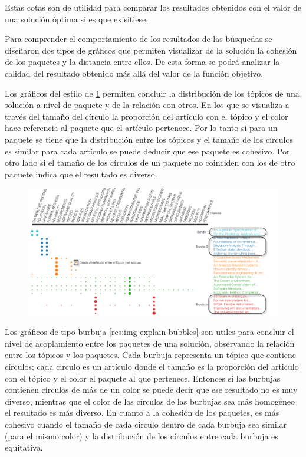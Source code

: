 Estas cotas son de utilidad para comparar los resultados obtenidos con el valor de una solución óptima si es que exisitiese.




Para comprender el comportamiento de los resultados de las búsquedas se diseñaron dos tipos de gráficos que permiten visualizar de la solución la cohesión de los paquetes y la distancia entre ellos. De esta forma se podrá analizar la calidad del resultado obtenido más allá del valor de la función objetivo.

Los gráficos del estilo de \ref{res:img-explain-bars} permiten concluir la distribución de los tópicos de una solución a nivel de paquete y de la relación con otros. En los que se visualiza a través del tamaño del círculo la proporción del artículo con el tópico y el color hace referencia al paquete que el artículo pertenece. Por lo tanto si para un paquete se tiene que la distribución entre los tópicos y el tamaño de los círculos es similar para cada artículo se puede deducir que ese paquete es cohesivo. Por otro lado si el tamaño de los círculos de un paquete no coinciden con los de otro paquete indica que el resultado es diverso.
\begin{figure}[H]
  \centering
    \includegraphics[width=1\textwidth]{img/explain-bars.png}
  \caption{}
  \label{res:img-explain-bars}
\end{figure}

Los gráficos de tipo burbuja \ref{res:img-explain-bubbles} son utiles para concluir el nivel de acoplamiento entre los paquetes de una solución, observando la relación entre los tópicos y los paquetes. Cada burbuja representa un tópico que contiene círculos; cada circulo es un artículo donde el tamaño es la proporción del articulo con el tópico y el color el paquete al que pertenece. Entonces si las burbujas contienen círculos de más de un color se puede decir que ese resultado no es muy diverso, mientras que el color de los círculos de las burbujas sea más homogéneo el resultado es más diverso. En cuanto a la cohesión de los paquetes, es más cohesivo cuando el tamaño de cada circulo dentro de cada burbuja sea similar (para el mismo color) y la distribución de los círculos entre cada burbuja es equitativa.

